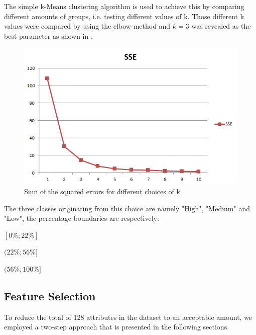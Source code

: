 The simple k-Means clustering algorithm is used to achieve this
by comparing different amounts of groups, i.e. testing
different values of k. Those different k values were compared by using
the elbow-method and \(k=3\) was revealed as the best parameter as
shown in .
\begin{figure}[H]
	\centering
	\includegraphics[width=\columnwidth]{../../charts/SSE.png}
	\caption{Sum of the squared errors for different choices of k}
	\label{fig:sse}
\end{figure}
\noindent The three classes originating from this choice are namely
"High", "Medium" and "Low", the percentage boundaries are
respectively:
\begin{description}
	\setlength{\itemsep}{-2pt}
	\item[Low:] \([0\%; 22\%]\) 
	\item[Medium:] \((22\%; 56\%]\)
	\item[High:] \((56\%; 100\%]\)
\end{description}

\subsection{Feature Selection}
\label{sec:feature_selection}    

To reduce the total of 128 attributes in the dataset to an acceptable
amount, we employed a two-step approach that is presented in the
following sections.

